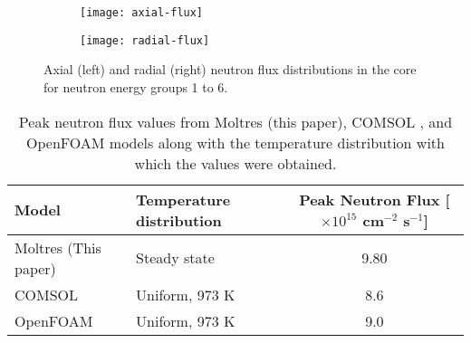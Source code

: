 \begin{figure}[t!]
    \centering
    \begin{subfigure}[t]{.49\textwidth}
        \centering
        \texttt{[image: axial-flux]}
    \end{subfigure}
    \begin{subfigure}[t]{.49\textwidth}
        \centering
        \texttt{[image: radial-flux]}
    \end{subfigure}
    \caption{Axial (left) and radial (right) neutron flux distributions in the
    core for neutron energy groups 1 to 6.}
    \label{fig:axialradial}
\end{figure}

\begin{table}[b!]
	\centering
	\caption{Peak neutron flux values from Moltres (this paper), COMSOL
	\cite{fiorina_molten_2013}, and OpenFOAM \cite{aufiero_development_2014}
	models along with the temperature distribution with which the values were
	obtained.}
	\begin{tabular}{l l S}
		\toprule
		{Model} & {Temperature distribution} & {Peak Neutron Flux [$\times 10^{15}$ cm$^{-2}$ s$^{-1}$]}
		\\
		\midrule
		{Moltres (This paper)} & {Steady state} & 9.80\\
		{COMSOL} & {Uniform, 973 K} & 8.6 \\
		{OpenFOAM} & {Uniform, 973 K} & 9.0 \\
		\bottomrule
	\end{tabular}
	\label{table:peak-flux}
\end{table}

